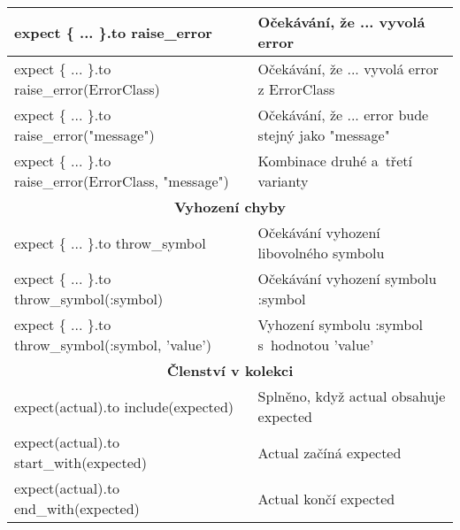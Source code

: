 \begin{center}
\begin{longtable}{| m{} | m{} |}
 \hline
 expect \{ ... \}.to raise\_error & Očekávání, že ... vyvolá error \\
 \hline
 expect \{ ... \}.to raise\_error(ErrorClass) & Očekávání, že ... vyvolá error z ErrorClass\\
 \hline
 expect \{ ... \}.to raise\_error("message") & Očekávání, že ... error bude stejný jako "message" \\
 \hline
 expect \{ ... \}.to raise\_error(ErrorClass, "message")  & Kombinace druhé a~třetí varianty \\
 \hline
 \multicolumn{2}{||c||}{\textbf{Vyhození chyby}}\\
 \hline
 expect \{ ... \}.to throw\_symbol & Očekávání vyhození libovolného symbolu\\ 
 \hline
 expect \{ ... \}.to throw\_symbol(:symbol) & Očekávání vyhození symbolu :symbol\\ 
 \hline
 expect \{ ... \}.to throw\_symbol(:symbol, 'value') & Vyhození symbolu :symbol s~hodnotou 'value'\\ 
 \hline
 \multicolumn{2}{||c||}{\textbf{Členství v kolekci}}\\
 \hline
 expect(actual).to include(expected) & Splněno, když actual obsahuje expected \\
 \hline
 expect(actual).to start\_with(expected) & Actual začíná expected \\
 \hline
 expect(actual).to end\_with(expected) & Actual končí expected \\
 \hline
 \hline
\end{longtable}
\end{center}

%
%
%
%
